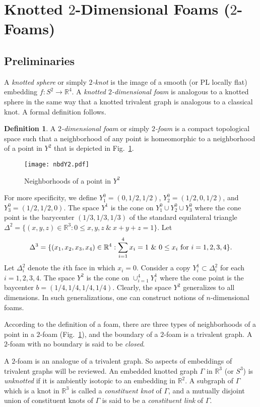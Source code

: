 \documentclass{amsart}
\newcommand{\R}{\mathbb{R}}
\theoremstyle{definition}
\newtheorem{definition}[theorem]{Definition}
\theoremstyle{remark}
\numberwithin{equation}{section}
\begin{document}
\section{Knotted $2$-Dimensional Foams ($2$-Foams)}

\subsection{Preliminaries}
A \emph{knotted sphere} or simply \emph{$2$-knot} is the image of a smooth (or PL locally flat) embedding $f:S^{2} \to \mathbb{R}^{4}$. A \emph{knotted $2$-dimensional foam} is analogous to a  knotted sphere in the same way that a knotted trivalent graph is analogous to a classical knot. A formal definition follows.

\begin{definition}
A \emph{$2$-dimensional foam} or simply \emph{$2$-foam} is a compact topological space such that a neighborhood of any point is homeomorphic to a neighborhood of a point in $Y^2$ that is depicted in  Fig.~\ref{1}.
\end{definition}

\begin{figure}[h]
\texttt{[image: nbdY2.pdf]}
\caption{Neighborhoods of a point in $Y^{2}$}
\label{1}
\end{figure}

For more specificity, we define $Y_1^0 =(0,1/2,1/2)$, $Y^0_2=(1/2,0,1/2)$, and $Y^0_3=(1/2,1/2,0)$. The space $Y^1$ is the cone on $Y_1^0 \cup Y^0_2 \cup Y^0_3$ where the cone point is the barycenter $(1/3,1/3,1/3)$ of the standard equilateral triangle
$\Delta^2= \{ (x,y,z) \in \R^3: 0 \le x,y,z \ \&  \ x+y+z=1 \}$. Let 
$$\Delta^3= \{ (x_1,x_2,x_3,x_4) \in \R^4 : \sum_{i=1}^4 x_i=1  \ \& \ 0\le x_i \ {\mbox{\rm for}} \ i=1,2,3,4 \}.$$ Let $\Delta^2_i$ denote the $i\/$th face in which $x_i=0$. Consider a copy $Y^1_i \subset \Delta^2_i$ for each $i=1,2,3,4.$ The space $Y^2$ is the cone on $\cup_{i=1}^4 Y^1_i$ where the cone point is the baycenter $b=(1/4,1/4,1/4,1/4)$. Clearly, the space $Y^2$ generalizes to all dimensions. In such generalizations, one can construct notions of $n$-dimensional foams. 

According to the definition of a foam, there are three types of neighborhoods of a point in a $2$-foam (Fig.~\ref{1}), and the boundary of a $2$-foam is a trivalent graph.  A $2$-foam with no boundary is said to be \emph{closed}. 

A $2$-foam is an analogue of a trivalent graph. So 
aspects of embeddings of trivalent graphs will be reviewed. An embedded knotted graph $\Gamma$ in $\mathbb{R}^{3}$ (or $S^{3}$) is \emph{unknotted} if it is ambiently isotopic to an embedding in $\mathbb{R}^{2}$. A subgraph of $\Gamma$ which is a knot in $\mathbb{R}^{3}$ is called a \emph{constituent knot} of $\Gamma$, and a mutually disjoint union of constituent knots of $\Gamma$ is said to be a \emph{constituent link} of $\Gamma$.
\end{document}
